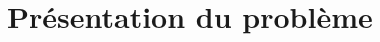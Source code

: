 \documentclass[12pt,usletter,twoside]{article}
\begin{document}
	\maketitle{}

	\section{Présentation du problème}
		\paragraph*{}


	\printbibliography[heading=bibintoc]{}
\end{document}
